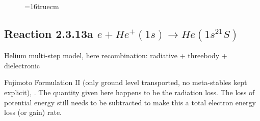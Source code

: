 \documentclass[12pt,dvipdfmx]{article}
\begin{document}
\begin{figure} \label{2.3.9aer}
\epsfxsize=16truecm
\end{figure}
\newpage


\subsection{
Reaction 2.3.13a $e+ He^+(1s) \rightarrow   He(1s^21S)$
}
Helium multi-step model, here recombination:  radiative + threebody + dielectronic

 Fujimoto Formulation II (only ground level transported, no meta-stables
 kept explicit), \cite{kn:Fujimoto}.
 The quantity given here happens to be the radiation loss.
 The loss of potential energy still needs to be subtracted to make
 this a total electron energy loss (or gain) rate.
\end{document}
